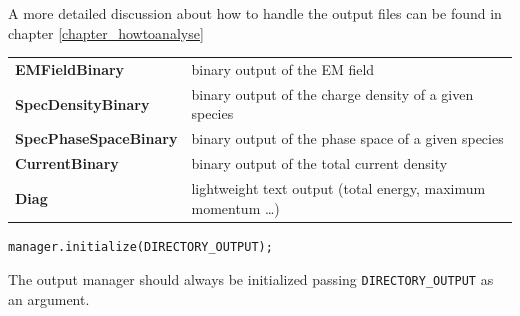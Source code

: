 \documentclass[11pt,a4paper]{report}
\begin{document}
A more detailed discussion about how to handle the output files can be found in chapter \ref{chapter_howtoanalyse}
\begin{center}
    \begin{tabular}{ l | l }
    	\textbf{EMFieldBinary} & binary output of the EM field\\
    	\textbf{SpecDensityBinary} & binary output of the charge density of a given species \\
    	\textbf{SpecPhaseSpaceBinary} & binary output of the phase space of a given species\\
    	\textbf{CurrentBinary} & binary output of the total current density\\
    	\textbf{Diag} & lightweight text output (total energy, maximum momentum \ldots) \\
    \end{tabular}
\end{center}

\begin{lstlisting}[backgroundcolor=\color{no_modify}]
	manager.initialize(DIRECTORY_OUTPUT);
\end{lstlisting}
The output manager should always be initialized passing \verb+DIRECTORY_OUTPUT+
as an argument. 
\end{document}
